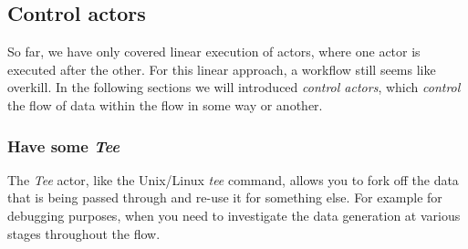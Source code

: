 \clearpage
\subsection{Control actors}
So far, we have only covered linear execution of actors, where one actor is
executed after the other. For this linear approach, a workflow still seems like
overkill. In the following sections we will introduced \textit{control actors},
which \textit{control} the flow of data within the flow in some way or another.

\subsubsection{Have some \textit{Tee}}
The \textit{Tee} actor, like the Unix/Linux \textit{tee} command, allows you to
fork off the data that is being passed through and re-use it for something else.
For example for debugging purposes, when you need to investigate the data
generation at various stages throughout the flow.

